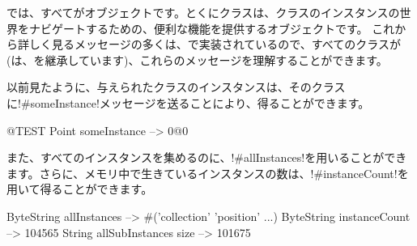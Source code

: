 \documentclass[a4paper,10pt,twoside]{book}
\begin{document}
\st{}では、すべてがオブジェクトです。とくにクラスは、クラスのインスタンスの世界をナビゲートするための、便利な機能を提供するオブジェクトです。%
これから詳しく見るメッセージの多くは、で実装されているので、すべてのクラスが(は、を継承しています)、これらのメッセージを理解することができます。

以前見たように、与えられたクラスのインスタンスは、そのクラスに\ct!#someInstance!メッセージを送ることにより、得ることができます。%
\begin{code}{@TEST} %
Point someInstance --> 0@0
\end{code}

また、すべてのインスタンスを集めるのに、\ct!#allInstances!を用いることができます。さらに、メモリ中で生きているインスタンスの数は、\ct!#instanceCount!を用いて得ることができます。

\begin{code}{} %
ByteString allInstances        --> #('collection' 'position'  ...)
ByteString instanceCount    --> 104565
String allSubInstances size -->  101675
\end{code}
\end{document}
